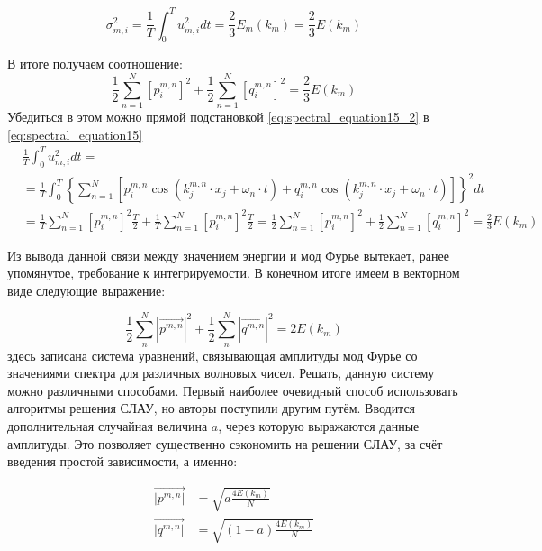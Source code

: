 \begin{equation}
    \label{eq:spectral_equation15_2}
    \sigma^2_{m,i} = \frac{1}{T} \int_{0}^{T} u_{m,i}^2 dt = \frac{2}{3} E_m(k_m) = \frac{2}{3} E(k_m) 
\end{equation}

В итоге получаем соотношение:
\begin{equation}
    \label{eq:spectral_equation15_3}
    \frac{1}{2} \sum_{n=1}^N \left[ p_i^{m,n} \right]^2 + \frac{1}{2} \sum_{n=1}^N \left[ q_i^{m,n} \right]^2 = \frac{2}{3} E(k_m) 
\end{equation}
Убедиться в этом можно прямой подстановкой \eqref{eq:spectral_equation15_2} в \eqref{eq:spectral_equation15}
\begin{align}
    & \frac{1}{T} \int_{0}^{T} u_{m,i}^2 dt = \nonumber \\ 
    & = \frac{1}{T} \int_{0}^{T} \left\{ \sum_{n = 1}^{N} \left[ p_{i}^{m,n} \cos{(k_j^{m,n} \cdot x_j + \omega_n \cdot t)} + q_{i}^{m,n} \cos{(k_j^{m,n} \cdot x_j + \omega_n \cdot t)}\right]  \right\}^2 dt                                                                          \nonumber \\
    & = \frac{1}{T} \sum_{n = 1}^{N} \left[p_i^{m,n}\right]^2 \frac{T}{2} + \frac{1}{T} \sum_{n = 1}^{N} \left[p_i^{m,n}\right]^2 \frac{T}{2} = \frac{1}{2} \sum_{n=1}^N \left[ p_i^{m,n} \right]^2 + \frac{1}{2} \sum_{n=1}^N \left[ q_i^{m,n} \right]^2 = \frac{2}{3} E(k_m)
\end{align}

Из вывода данной связи между значением энергии и мод Фурье вытекает, ранее упомянутое, требование к интегрируемости. В конечном итоге имеем в векторном виде следующие выражение:

\begin{equation}
    \label{eq:spectral_equation16}
    \frac{1}{2} \sum_{n}^N |\vec{p^{m,n}}|^2 + \frac{1}{2} \sum_{n}^N |\vec{q^{m,n}}|^2 = 2 E(k_m)
\end{equation}
\noindent
здесь записана система уравнений, связывающая амплитуды мод Фурье со значениями спектра для различных волновых чисел. Решать, данную систему можно различными способами. Первый наиболее очевидный способ использовать алгоритмы решения СЛАУ, но авторы поступили другим путём. Вводится дополнительная случайная величина $a$, через которую выражаются данные амплитуды. Это позволяет существенно сэкономить на решении СЛАУ, за счёт введения простой зависимости, а именно:

\begin{align}
    \label{eq:spectral_equation16_2}
    \vec{|p^{m,n}|} & = \sqrt{a \frac{4 E(k_m)}{N}} \nonumber \\
    \vec{|q^{m,n}|} & = \sqrt{(1 - a) \frac{4 E(k_m)}{N}}
\end{align}

